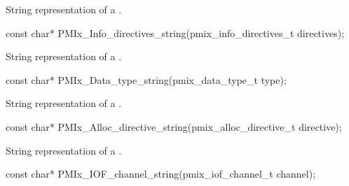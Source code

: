\summary
{}

String representation of a .

\cspecificstart
\begin{codepar}
const char*
PMIx_Info_directives_string(pmix_info_directives_t directives);
\end{codepar}
\cspecificend

\summary
{}

String representation of a .

\cspecificstart
\begin{codepar}
const char*
PMIx_Data_type_string(pmix_data_type_t type);
\end{codepar}
\cspecificend

\summary
{}

String representation of a .

\cspecificstart
\begin{codepar}
const char*
PMIx_Alloc_directive_string(pmix_alloc_directive_t directive);
\end{codepar}
\cspecificend

\summary
{}

String representation of a .

\cspecificstart
\begin{codepar}
const char*
PMIx_IOF_channel_string(pmix_iof_channel_t channel);
\end{codepar}
\cspecificend



